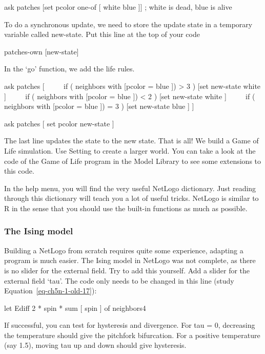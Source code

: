 \documentclass[
  a4paper,
  DIV=11,
  numbers=noendperiod,
  oneside]{scrreprt}
\begin{document}
{ask} {patches} {{[}}{set} {pcolor one-of} {{[}} {white blue} {]}{]} {;
white is dead, blue is alive}

To do a synchronous update, we need to store the update state in a
temporary variable called new-state. Put this line at the top of your
code

{patches-own} {{[}new-state{]}}

In the `go' function, we add the life rules.

{ask} {patches} {{[}} ~~~~ {if} {(} {neighbors with} {{[}}{pcolor =}
{blue} {]}) {\textgreater{}} {3} {)} {{[}}{set} {new-state} {white} {]}
~~~~ {if} {(} {neighbors with} {{[}}{pcolor =} {blue} {]}) {\textless{}}
{2} {)} {{[}}{set} {new-state} {white} {]} ~~~~ {if} {(} {neighbors
with} {{[}}{pcolor =} {blue} {]}) {=} {3} {)} {{[}}{set} {new-state}
{blue} {]} {{]}}

{ask} {patches} {[} {}{set} {pcolor} {new-state} {]}

The last line updates the state to the new state. That is all! We build
a Game of Life simulation. Use Setting to create a larger world. You can
take a look at the code of the Game of Life program in the Model Library
to see some extensions to this code.

In the help menu, you will find the very useful NetLogo dictionary. Just
reading through this dictionary will teach you a lot of useful tricks.
NetLogo is similar to R in the sense that you should use the built-in
functions as much as possible.

\hypertarget{sec-The-Ising-model}{%
\subsubsection{The Ising model}\label{sec-The-Ising-model}}

Building a NetLogo from scratch requires quite some experience, adapting
a program is much easier. The Ising model in NetLogo was not complete,
as there is no slider for the external field. Try to add this yourself.
Add a slider for the external field `tau'. The code only needs to be
changed in this line (study Equation~\ref{eq-ch5n-1-old-17}):

{let} {Ediff} {2} {*} {spin} {* sum} {{[} spin {]}} {of neighbors4}

If successful, you can test for hysteresis and divergence. For tau = 0,
decreasing the temperature should give the pitchfork bifurcation. For a
positive temperature (say 1.5), moving tau up and down should give
hysteresis.
\end{document}
